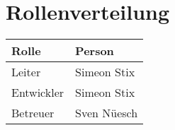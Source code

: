 \section{Rollenverteilung}
\label{sec:PlanungRollenverteilung}

\begin{table}[H]
\centering
\begin{xltabular}{\linewidth}{|l|X|}
\hline
\textbf{Rolle} & \textbf{Person}
\\\hline
Leiter & Simeon Stix
\\\hline
Entwickler & Simeon Stix
\\\hline
Betreuer & Sven Nüesch
\\\hline
\end{xltabular}
\label{tab:planungrollenverteilungtable}
\end{table}




